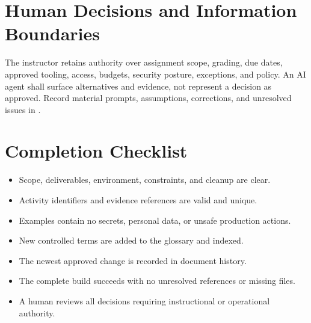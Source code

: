 \section{Human Decisions and Information Boundaries}
The instructor retains authority over assignment scope, grading, due dates,
approved tooling, access, budgets, security posture, exceptions, and policy.
An AI agent shall surface alternatives and evidence, not represent a decision
as approved. Record material prompts, assumptions, corrections, and unresolved
issues in .

\section{Completion Checklist}
\begin{itemize}
\item Scope, deliverables, environment, constraints, and cleanup are clear.
\item Activity identifiers and evidence references are valid and unique.
\item Examples contain no secrets, personal data, or unsafe production actions.
\item New controlled terms are added to the glossary and indexed.
\item The newest approved change is recorded in document history.
\item The complete build succeeds with no unresolved references or missing files.
\item A human reviews all decisions requiring instructional or operational authority.
\end{itemize}
